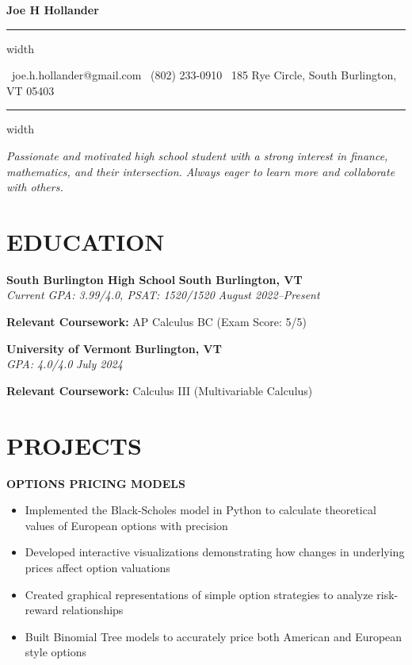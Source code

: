 \documentclass[10pt,letterpaper]{article}
\newcommand{\name}[1]{
  \begin{center}
    \Huge\textbf{\color{headingcolor}#1}
  \end{center}
  \vspace{-0.5em}
  \hrule height 0.8pt width \textwidth
  \vspace{0.5em}
}
\newcommand{\contact}[3]{
  \begin{center}
    \faEnvelope\ #1 \hspace{1em} \faPhone\ #2 \hspace{1em} \faMapMarker*\ #3
  \end{center}
  \vspace{-0.5em}
  \hrule height 0.4pt width \textwidth
  \vspace{0.5em}
}
\newcommand{\role}[4]{
  \textbf{\color{subheadingcolor}#1} \hfill \textbf{#2} \\
  \textit{#3} \hfill \textit{#4}
}
\begin{document}
\name{Joe H Hollander}
\vspace{-0.25em}
\contact{joe.h.hollander@gmail.com}{(802) 233-0910}{185 Rye Circle, South Burlington, VT 05403}

\vspace{-0.25em}
\begin{center}
\textit{Passionate and motivated high school student with a strong interest in finance, mathematics, and their intersection.
Always eager to learn more and collaborate with others. }
\end{center}

\section{EDUCATION}

\vspace{0.5em}
\role{South Burlington High School}{South Burlington, VT}{Current GPA: 3.99/4.0, PSAT: 1520/1520}{August 2022--Present}   
\begin{flushleft}
\textbf{Relevant Coursework:} AP Calculus BC (Exam Score: 5/5)\\
\end{flushleft}

\vspace{0.5em}
\begin{flushleft}
\textbf{\color{subheadingcolor}University of Vermont} \hfill \textbf{Burlington, VT} \\
\textit{GPA: 4.0/4.0} \hfill \textit{July 2024}
\end{flushleft}
\begin{flushleft}
\textbf{Relevant Coursework:} Calculus III (Multivariable Calculus)\\
\end{flushleft}

\vspace{0.5em}
\section{PROJECTS}
\vspace{0.5em}

\begin{flushleft}
  \textbf{\color{subheadingcolor}OPTIONS PRICING MODELS}
  \begin{itemize}[leftmargin=*,nosep,itemsep=2pt]
      \item Implemented the Black-Scholes model in Python to calculate theoretical values of European options with precision
      \item Developed interactive visualizations demonstrating how changes in underlying prices affect option valuations
      \item Created graphical representations of simple option strategies to analyze risk-reward relationships
      \item Built Binomial Tree models to accurately price both American and European style options
  \end{itemize}
  \end{flushleft}
\end{document}

